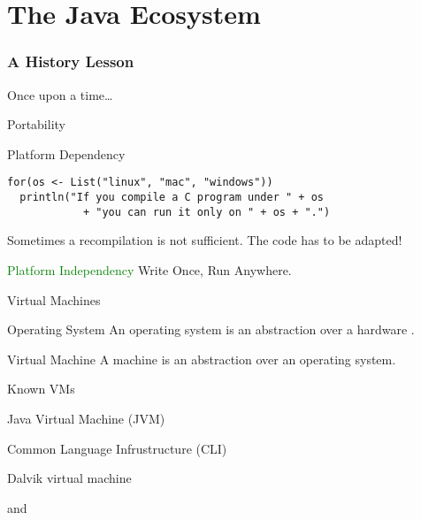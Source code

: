 \part[The Java Ecosystem]{The Java Ecosystem}
\section{A History Lesson}

\begin{frame}{Once upon a time\ldots}
\end{frame}

\begin{frame}[fragile]{Portability}
\begin{block}{\alert{Platform Dependency}}
\begin{lstlisting}
for(os <- List("linux", "mac", "windows"))
  println("If you compile a C program under " + os
            + "you can run it only on " + os + ".")
\end{lstlisting}
\end{block}
\pause
Sometimes a recompilation is not sufficient. \alert{The code} has to be adapted!
\pause
\begin{block}{\textcolor{green}{Platform Independency}}
Write Once, Run Anywhere.
\end{block}
\end{frame}



\begin{frame}{Virtual Machines}
\begin{block}{Operating System}
An operating system is an abstraction over a hardware .
\end{block}
\begin{block}{Virtual Machine}
A  machine is an abstraction over an operating system.
\end{block}
\begin{exampleblock}{Known VMs}
\begin{description}
  \item[Java] Java Virtual Machine (JVM)
  \item[.Net] Common Language Infrustructure (CLI)
  \item[Android] Dalvik virtual machine
  \item
  and
\end{description}
\end{exampleblock}
\end{frame}

